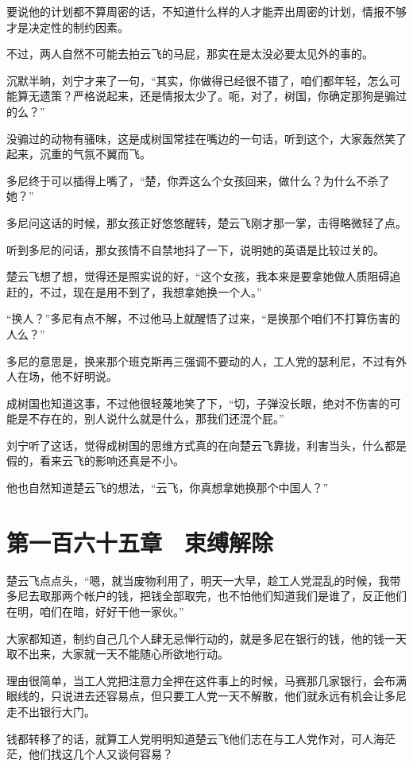 要说他的计划都不算周密的话，不知道什么样的人才能弄出周密的计划，情报不够才是决定性的制约因素。

不过，两人自然不可能去拍云飞的马屁，那实在是太没必要太见外的事的。

沉默半晌，刘宁才来了一句，“其实，你做得已经很不错了，咱们都年轻，怎么可能算无遗策？严格说起来，还是情报太少了。呃，对了，树国，你确定那狗是骟过的么？”

没骟过的动物有骚味，这是成树国常挂在嘴边的一句话，听到这个，大家轰然笑了起来，沉重的气氛不翼而飞。

多尼终于可以插得上嘴了，“楚，你弄这么个女孩回来，做什么？为什么不杀了她？”

多尼问这话的时候，那女孩正好悠悠醒转，楚云飞刚才那一掌，击得略微轻了点。

听到多尼的问话，那女孩情不自禁地抖了一下，说明她的英语是比较过关的。

楚云飞想了想，觉得还是照实说的好，“这个女孩，我本来是要拿她做人质阻碍追赶的，不过，现在是用不到了，我想拿她换一个人。”

“换人？”多尼有点不解，不过他马上就醒悟了过来，“是换那个咱们不打算伤害的人么？”

多尼的意思是，换来那个班克斯再三强调不要动的人，工人党的瑟利尼，不过有外人在场，他不好明说。

成树国也知道这事，不过他很轻蔑地笑了下，“切，子弹没长眼，绝对不伤害的可能是不存在的，别人说什么就是什么，那我们还混个屁。”

刘宁听了这话，觉得成树国的思维方式真的在向楚云飞靠拢，利害当头，什么都是假的，看来云飞的影响还真是不小。

他也自然知道楚云飞的想法，“云飞，你真想拿她换那个中国人？”

\section{第一百六十五章　束缚解除}

楚云飞点点头，“嗯，就当废物利用了，明天一大早，趁工人党混乱的时候，我带多尼去取那两个帐户的钱，把钱全部取完，也不怕他们知道我们是谁了，反正他们在明，咱们在暗，好好干他一家伙。”

大家都知道，制约自己几个人肆无忌惮行动的，就是多尼在银行的钱，他的钱一天取不出来，大家就一天不能随心所欲地行动。

理由很简单，当工人党把注意力全押在这件事上的时候，马赛那几家银行，会布满眼线的，只说进去还容易点，但只要工人党一天不解散，他们就永远有机会让多尼走不出银行大门。

钱都转移了的话，就算工人党明明知道楚云飞他们志在与工人党作对，可人海茫茫，他们找这几个人又谈何容易？

